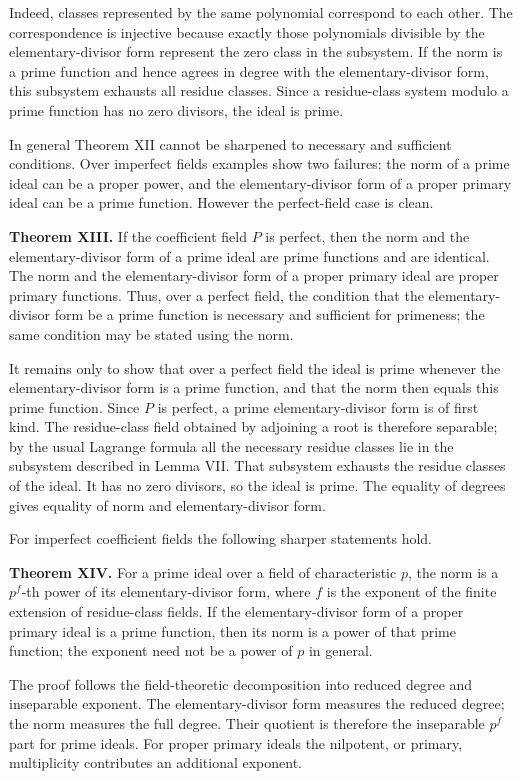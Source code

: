 \documentclass[11pt]{article}
\begin{document}
Indeed, classes represented by the same polynomial correspond to each other. The correspondence is injective because exactly those polynomials divisible by the elementary-divisor form represent the zero class in the subsystem. If the norm is a prime function and hence agrees in degree with the elementary-divisor form, this subsystem exhausts all residue classes. Since a residue-class system modulo a prime function has no zero divisors, the ideal is prime.

In general Theorem XII cannot be sharpened to necessary and sufficient conditions. Over imperfect fields examples show two failures: the norm of a prime ideal can be a proper power, and the elementary-divisor form of a proper primary ideal can be a prime function. However the perfect-field case is clean.

\textbf{Theorem XIII.} If the coefficient field $P$ is perfect, then the norm and the elementary-divisor form of a prime ideal are prime functions and are identical. The norm and the elementary-divisor form of a proper primary ideal are proper primary functions. Thus, over a perfect field, the condition that the elementary-divisor form be a prime function is necessary and sufficient for primeness; the same condition may be stated using the norm.

It remains only to show that over a perfect field the ideal is prime whenever the elementary-divisor form is a prime function, and that the norm then equals this prime function. Since $P$ is perfect, a prime elementary-divisor form is of first kind. The residue-class field obtained by adjoining a root is therefore separable; by the usual Lagrange formula all the necessary residue classes lie in the subsystem described in Lemma VII. That subsystem exhausts the residue classes of the ideal. It has no zero divisors, so the ideal is prime. The equality of degrees gives equality of norm and elementary-divisor form.

For imperfect coefficient fields the following sharper statements hold.

\textbf{Theorem XIV.} For a prime ideal over a field of characteristic $p$, the norm is a $p^f$-th power of its elementary-divisor form, where $f$ is the exponent of the finite extension of residue-class fields. If the elementary-divisor form of a proper primary ideal is a prime function, then its norm is a power of that prime function; the exponent need not be a power of $p$ in general.

The proof follows the field-theoretic decomposition into reduced degree and inseparable exponent. The elementary-divisor form measures the reduced degree; the norm measures the full degree. Their quotient is therefore the inseparable $p^f$ part for prime ideals. For proper primary ideals the nilpotent, or primary, multiplicity contributes an additional exponent.
\end{document}
